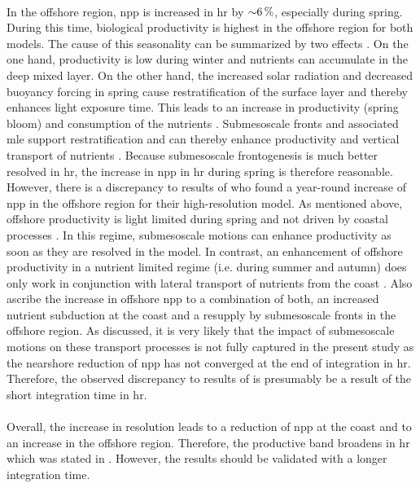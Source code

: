 \\
In the offshore region, \ac{npp} is increased in \ac{hr} by ${\sim} \SI{6}{\percent}$, especially during spring. During this time, biological productivity is highest in the offshore region for both models. The cause of this seasonality can be summarized by two effects \autocite{mahadevan-2012-na-spring-bloom}. On the one hand, productivity is low during winter and nutrients can accumulate in the deep mixed layer. On the other hand, the increased solar radiation and decreased buoyancy forcing in spring cause restratification of the surface layer and thereby enhances light exposure time. This leads to an increase in productivity (spring bloom) and consumption of the nutrients \autocite{mahadevan-2012-na-spring-bloom}. Submesoscale fronts and associated \ac{mle} support restratification and can thereby enhance productivity \autocite{mahadevan-2012-na-spring-bloom} and vertical transport of nutrients \autocite{mahadevan-2016-subm-review}. Because submesoscale frontogenesis is much better resolved in \ac{hr}, the increase in \ac{npp} in \ac{hr} during spring is therefore reasonable.\\
However, there is a discrepancy to results of \textcite{kessouri-2020-seasonal-prod} who found a year-round increase of \ac{npp} in the offshore region for their high-resolution model. As mentioned above, offshore productivity is light limited during spring and not driven by coastal processes \autocite{longhurst-2007-empfehlung-urs}. In this regime, submesoscale motions can enhance productivity as soon as they are resolved in the model. In contrast, an enhancement of offshore productivity in a nutrient limited regime (i.e. during summer and autumn) does only work in conjunction with lateral transport of nutrients from the coast \autocite{lathuliere-2010, gruber-2011-eddy-red}. Also \textcite{kessouri-2020-seasonal-prod} ascribe the increase in offshore \ac{npp} to a combination of both, an increased nutrient subduction at the coast and a resupply by submesoscale fronts in the offshore region. As discussed, it is very likely that the impact of submesoscale motions on these transport processes is not fully captured in the present study as the nearshore reduction of \ac{npp} has not converged at the end of integration in \ac{hr}. Therefore, the observed discrepancy to results of \textcite{kessouri-2020-seasonal-prod} is presumably be a result of the short integration time in \ac{hr}.\\
\\
Overall, the increase in resolution leads to a reduction of \ac{npp} at the coast and to an increase in the offshore region. Therefore, the productive band broadens in \ac{hr} which was stated in . However, the results should be validated with a longer integration time.\\
